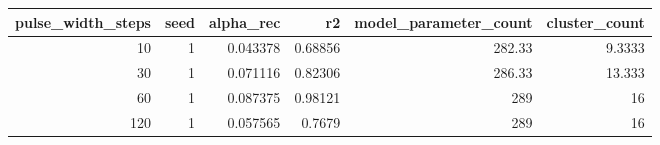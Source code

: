 \begin{tabular}{rrrrrr}
\toprule
pulse\_width\_steps & seed & alpha\_rec & r2 & model\_parameter\_count & cluster\_count \\
\midrule
10 & 1 & 0.043378 & 0.68856 & 282.33 & 9.3333 \\
30 & 1 & 0.071116 & 0.82306 & 286.33 & 13.333 \\
60 & 1 & 0.087375 & 0.98121 & 289 & 16 \\
120 & 1 & 0.057565 & 0.7679 & 289 & 16 \\
\bottomrule
\end{tabular}
